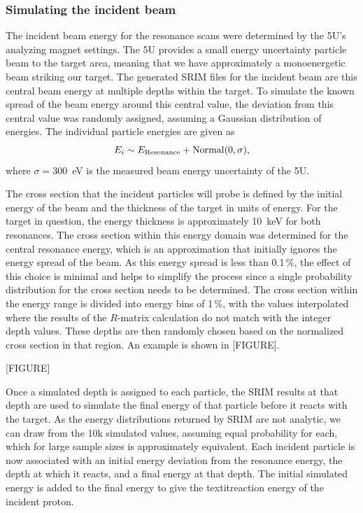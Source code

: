 \subsubsection{Simulating the incident
beam}\label{simulating-the-incident-beam}

The incident beam energy for the resonance scans were determined by the
5U's analyzing magnet settings. The 5U provides a small energy
uncertainty particle beam to the target area, meaning that we have
approximately a monoenergetic beam striking our target. The generated
SRIM files for the incident beam are this central beam energy at
multiple depths within the target. To simulate the known spread of the
beam energy around this central value, the deviation from this central
value was randomly assigned, assuming a Gaussian distribution of
energies. The individual particle energies are given as
\[
    E_i \sim E_{\rm{Resonance}} + \rm{Normal}(0, \sigma),
\]
where $\sigma = 300$~eV is the measured beam energy uncertainty of the 5U.

The cross section that the incident particles will probe is defined by
the initial energy of the beam and the thickness of the target in units
of energy. For the target in question, the energy thickness is
approximately 10~keV for both resonances. The cross
section within this energy domain was determined for the central
resonance energy, which is an approximation that initially ignores the
energy spread of the beam. As this energy spread is less than 0.1\,\%,
the effect of this choice is minimal and helps to simplify the process
since a single probability distribution for the cross section needs to
be determined. The cross section within the energy range is divided into
energy bins of 1\,\%, with the values interpolated where the results of
the $R$-matrix calculation do not match with the integer depth values.
These depths are then randomly chosen based on the normalized cross
section in that region. An example is shown in [FIGURE].

[FIGURE]

Once a simulated depth is assigned to each particle, the SRIM results at
that depth are used to simulate the final energy of that particle before
it reacts with the target. As the energy distributions returned by SRIM
are not analytic, we can draw from the 10k simulated values, assuming
equal probability for each, which for large sample sizes is
approximately equivalent. Each incident particle is now associated with
an initial energy deviation from the resonance energy, the depth at
which it reacts, and a final energy at that depth. The initial simulated
energy is added to the final energy to give the textit{reaction
energy} of the incident proton.


